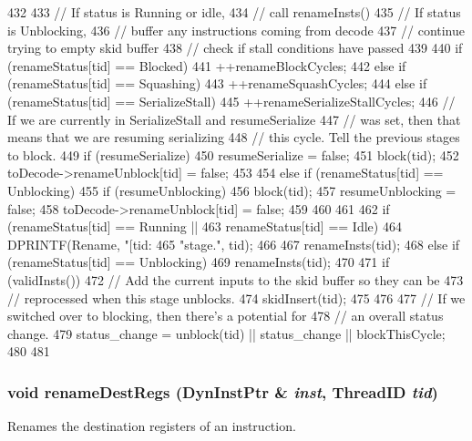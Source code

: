 \begin{DoxyCode}
432 {
433     // If status is Running or idle,
434     //     call renameInsts()
435     // If status is Unblocking,
436     //     buffer any instructions coming from decode
437     //     continue trying to empty skid buffer
438     //     check if stall conditions have passed
439 
440     if (renameStatus[tid] == Blocked) {
441         ++renameBlockCycles;
442     } else if (renameStatus[tid] == Squashing) {
443         ++renameSquashCycles;
444     } else if (renameStatus[tid] == SerializeStall) {
445         ++renameSerializeStallCycles;
446         // If we are currently in SerializeStall and resumeSerialize
447         // was set, then that means that we are resuming serializing
448         // this cycle.  Tell the previous stages to block.
449         if (resumeSerialize) {
450             resumeSerialize = false;
451             block(tid);
452             toDecode->renameUnblock[tid] = false;
453         }
454     } else if (renameStatus[tid] == Unblocking) {
455         if (resumeUnblocking) {
456             block(tid);
457             resumeUnblocking = false;
458             toDecode->renameUnblock[tid] = false;
459         }
460     }
461 
462     if (renameStatus[tid] == Running ||
463         renameStatus[tid] == Idle) {
464         DPRINTF(Rename, "[tid:%
465                 "stage.\n", tid);
466 
467         renameInsts(tid);
468     } else if (renameStatus[tid] == Unblocking) {
469         renameInsts(tid);
470 
471         if (validInsts()) {
472             // Add the current inputs to the skid buffer so they can be
473             // reprocessed when this stage unblocks.
474             skidInsert(tid);
475         }
476 
477         // If we switched over to blocking, then there's a potential for
478         // an overall status change.
479         status_change = unblock(tid) || status_change || blockThisCycle;
480     }
481 }
\end{DoxyCode}
\hypertarget{classDefaultRename_a21ced1baf75f43ecfa99d8c90ae210d6}{
\subsubsection[{renameDestRegs}]{\setlength{\rightskip}{0pt plus 5cm}void renameDestRegs ({\bf DynInstPtr} \& {\em inst}, \/  {\bf ThreadID} {\em tid})}}
\label{classDefaultRename_a21ced1baf75f43ecfa99d8c90ae210d6}
Renames the destination registers of an instruction. 


